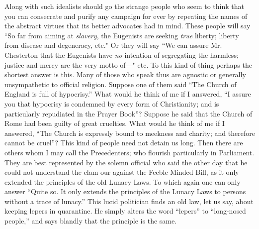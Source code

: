 \documentclass{book}
\begin{document}
Along with such idealists should go the strange people who seem to think that you can consecrate and purify any campaign for ever by repeating the names of the abstract virtues that its better advocates had in mind. These people will say “So far from aiming at \emph{slavery}, the Eugenists are seeking \emph{true} liberty; liberty from disease and degeneracy, etc." Or they will say “We can assure Mr. Chesterton that the Eugenists have \emph{no} intention of segregating the harmless; justice and mercy are the very motto of—" etc. To this kind of thing perhaps the shortest answer is this. Many of those who speak thus are agnostic or generally unsympathetic to official religion. Suppose one of them said “The Church of England is full of hypocrisy.” What would he think of me if I answered, “I assure you that hypocrisy is condemned by every form of Christianity; and is particularly repudiated in the Prayer Book”? Suppose he said that the Church of Rome had been guilty of great cruelties. What would he think of me if I answered, “The Church is expressly bound to meekness and charity; and therefore cannot be cruel”? This kind of people need not detain us long. Then there are others whom I may call the Precedenters; who flourish particularly in Parliament. They are best represented by the solemn official who said the other day that he could not understand the clam our against the Feeble-Minded Bill, as it only extended the principles of the old Lunacy Laws. To which again one can only answer “Quite so. It only extends the principles of the Lunacy Laws to persons without a trace of lunacy.” This lucid politician finds an old law, let us say, about keeping lepers in quarantine. He simply alters the word “lepers” to “long-nosed people,” and says blandly that the principle is the same.
\end{document}
